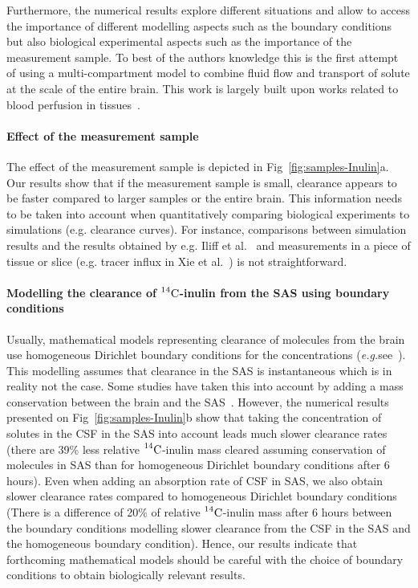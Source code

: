 \documentclass[10pt]{article}
\newcommand{\eg}{\emph{e.g.}\;}
\newcommand{\1}{^{(1)}}
\newcommand{\2}{^{(2)}}
\newcommand{\Cinulin}{$\prescript{14}{}{\text{C}}$-inulin }
\begin{document}
Furthermore, the numerical results explore different situations and allow to access the importance of different modelling aspects such as the boundary conditions but also biological experimental aspects such as the importance of the measurement sample. 
To best of the authors knowledge this is the first attempt of using a multi-compartment model to combine fluid flow and transport of solute at the scale of the entire brain. This work is largely built upon works related to blood perfusion in tissues~\cite{shipley_multiscale_2010,shipley-four-comp, Penta-homogenization-2015}.   

\paragraph{Effect of the measurement sample}
The effect of the measurement sample is depicted in Fig~\ref{fig:samples-Inulin}a. Our results show that if the measurement sample is small, clearance appears to be faster compared to larger samples or the entire brain. This information needs to be taken into account when quantitatively comparing biological experiments to simulations (e.g. clearance curves). For instance, comparisons between simulation results and the results obtained by e.g. Iliff et al.~\cite{Iliff_2012_PVS} and measurements in a piece of tissue or slice (e.g. tracer influx in Xie et al.~\cite{Xie_2013_sleep}) is not straightforward. 

\paragraph{Modelling the clearance of \Cinulin from the SAS using boundary conditions}
Usually, mathematical models representing clearance of molecules from the brain use homogeneous Dirichlet boundary conditions for the concentrations (\eg see~\cite{Holter9894,stoverud_modeling_2012}). This modelling assumes that clearance in the SAS is instantaneous which is in reality not the case. Some studies have taken this into account by adding a mass conservation between the brain and the SAS~\cite{croci2019uncertainty}.
However, the numerical results presented on Fig~\ref{fig:samples-Inulin}b show that taking the concentration of solutes in the CSF in the SAS into account leads much slower clearance rates (there are 39\% less relative \Cinulin mass cleared assuming conservation of molecules in SAS than for homogeneous Dirichlet boundary conditions after 6 hours). Even when adding an absorption rate of CSF in SAS, we also obtain slower clearance rates compared to homogeneous Dirichlet boundary conditions (There is a difference of 20\% of relative \Cinulin mass after 6 hours between the boundary conditions modelling slower clearance from the CSF in the SAS and the homogeneous boundary condition). Hence, our results indicate that forthcoming mathematical models should be careful with the choice of boundary conditions to obtain biologically relevant results.
\end{document}
